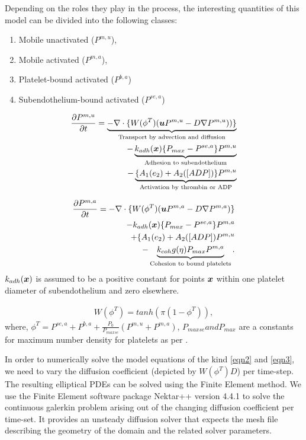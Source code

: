 Depending on the roles they play in the process, the interesting quantities of this model can be divided into the following classes: 
\begin{enumerate}
\item Mobile unactivated ($P^{m,u}$), 
\item Mobile activated ($P^{m,a}$), 
\item Platelet-bound activated ($P^{b,a}$)
\item Subendothelium-bound activated ($P^{se,a}$)
\end{enumerate}


\begin{align}
    \frac{\partial P^{m,u}}{\partial t} = \underbrace{-\nabla \cdot \{ W(\phi^T) (\boldsymbol{u} P^{m,u} - D \nabla P^{m,u}))\} }_\text{Transport by advection and diffusion} \nonumber\\
    - \underbrace{k_{adh}(\boldsymbol{x}) \{P_{max} - P^{se,a} \} P^{m,u}}_\text{Adhesion to subendothelium} \nonumber\\
    - \underbrace{\{A_1 (e_2) +A_2([ADP])\}P^{m,u} }_\text{Activation by thrombin or ADP} \label{eqn2}
\end{align}

\begin{align}
    \frac{\partial P^{m,a}}{\partial t} = - \nabla \cdot \{W(\phi^T)(\boldsymbol{u} P^{m,a} - D \nabla P^{m,a} ) \} \nonumber\\
    -k_{adh}(\boldsymbol{x})\{P_{max} - P^{se,a} \} P^{m,a} \nonumber\\
    +\{ A_1 (e_2) + A_2([ADP])P^{m,u} \nonumber\\
    -\underbrace{k_{coh} g(\eta) P_{max} P^{m,a}}_\text{Cohesion to bound platelets}. \label{eqn3}
\end{align}
$k_{adh}(\boldsymbol{x})$ is assumed to  be a positive constant for points $\boldsymbol{x}$ within one platelet diameter of subendothelium and zero elsewhere. 

\begin{align} 
    W(\phi^T) = tanh(\pi (1-\phi^T)),  \label{eqn6}
\end{align}
where, $\phi^T = P^{se,a}+P^{b,a}+\frac{P_0}{P_{maxse}}(P^{m,u}+P^{m,a})$, $P_{maxse} and P_{max}$ are a constants for maximum number density for platelets as per \cite{leiderman2011grow}.


In order to numerically solve the model equations of the kind \eqref{eqn2} and \eqref{eqn3}, we need to vary the diffusion coefficient  (depicted by $W(\phi^T)D$) per time-step. The resulting elliptical PDEs can be solved using the Finite Element method. We use the Finite Element software package Nektar++ \cite{nekpp} version 4.4.1 to solve the continuous galerkin problem arising out of the changing diffusion coefficient per time-set. It provides an unsteady diffusion solver that expects the mesh file describing the geometry of the domain and the related solver parameters.\\


